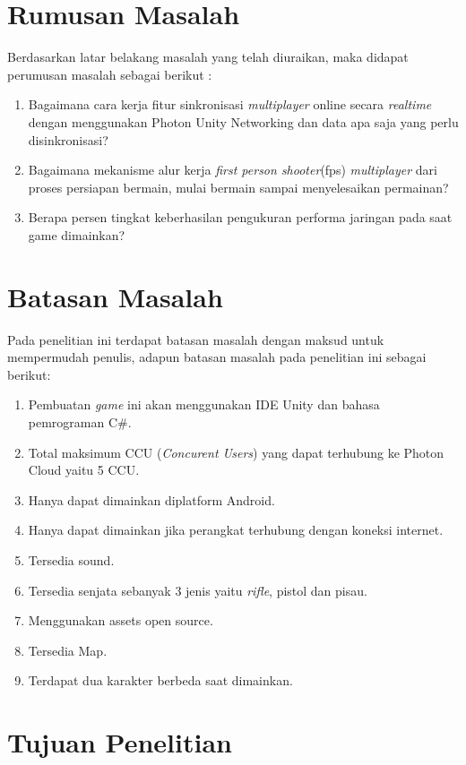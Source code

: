 \section{Rumusan Masalah}
\noindent

Berdasarkan latar belakang masalah yang telah diuraikan, maka didapat perumusan masalah sebagai berikut :
\begin{enumerate}
	\item Bagaimana cara kerja fitur sinkronisasi \textit{multiplayer} online secara \textit{realtime} dengan menggunakan Photon Unity Networking dan data apa saja yang perlu disinkronisasi?
	\item Bagaimana mekanisme alur kerja \textit{first person shooter}(fps) \textit{multiplayer} dari proses persiapan bermain, mulai bermain sampai menyelesaikan permainan?
	\item Berapa persen tingkat keberhasilan pengukuran performa jaringan pada saat game dimainkan?
\end{enumerate}

\section{Batasan Masalah}
\noindent

Pada penelitian ini terdapat batasan masalah dengan maksud untuk mempermudah penulis, adapun batasan masalah pada penelitian ini sebagai berikut:
\begin{enumerate}
	\item Pembuatan \textit{\textit{game}} ini akan menggunakan IDE Unity dan bahasa pemrograman C\#.
	\item Total maksimum CCU (\textit{Concurent Users}) yang dapat terhubung ke Photon Cloud yaitu 5 CCU.
	\item Hanya dapat dimainkan diplatform Android.
	\item Hanya dapat dimainkan jika perangkat terhubung dengan koneksi internet.
	\item Tersedia sound.
	\item Tersedia senjata sebanyak 3 jenis yaitu \textit{rifle}, pistol dan pisau.
	\item Menggunakan assets open source.
	\item Tersedia Map.
	\item Terdapat dua karakter berbeda saat dimainkan.
\end{enumerate}

\section{Tujuan Penelitian}
\noindent

